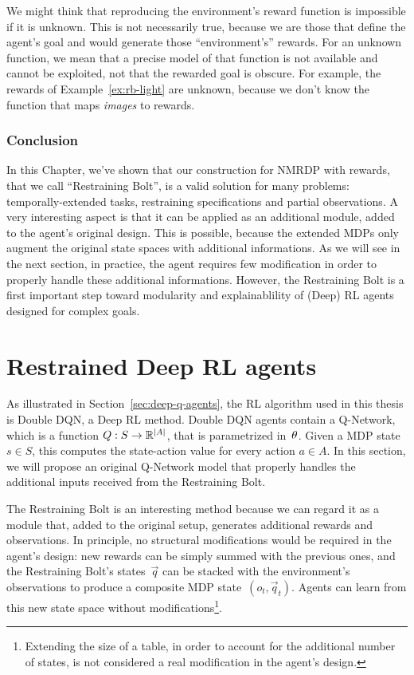 We might think that reproducing the environment's reward function is
impossible if it is unknown. This is not necessarily true, because we are
those that define the agent's goal and would generate those ``environment's''
rewards. For an unknown function, we mean that a precise model of that
function is not available and cannot be exploited, not that the rewarded goal
is obscure. For example, the rewards of Example~\ref{ex:rb-light} are unknown,
because we don't know the function that maps \emph{images} to rewards.


\subsubsection*{Conclusion}

In this Chapter, we've shown that our construction for NMRDP with \ldl{}
rewards, that we call ``Restraining Bolt'', is a valid solution for many
problems: temporally-extended tasks, restraining specifications and partial
observations. A very interesting aspect is that it can be applied as an
additional module, added to the agent's original design. This is possible,
because the extended MDPs only augment the original state spaces with
additional informations. As we will see in the next section, in practice, the
agent requires few modification in order to properly handle these additional
informations. However, the Restraining Bolt is a first important step toward
modularity and explainablility of (Deep) RL agents designed for complex
goals.



\section{Restrained Deep RL agents}

\label{sec:rb-deep-model}

As illustrated in Section~\ref{sec:deep-q-agents}, the RL algorithm used in
this thesis is Double DQN, a Deep RL method. Double DQN agents contain a
Q-Network, which is a function $Q: S \to \mathbb{R}^{\lvert A\rvert}$, that is parametrized
in~$\theta$. Given a MDP state~$s \in S$, this computes the state-action
value for every action $a \in A$. In this section, we will propose an original
Q-Network model that properly handles the additional inputs received from the
Restraining Bolt.

The Restraining Bolt is an interesting method because we can regard it as a
module that, added to the original setup, generates additional rewards and
observations. In principle, no structural modifications would be required in
the agent's design: new rewards can be simply summed with the previous ones,
and the Restraining Bolt's states~$\vec{q}$ can be stacked with the
environment's observations to produce a composite MDP state~$(o_t,
\vec{q}_t)$. Agents can learn from this new state space without
modifications\footnote{Extending the size of a table, in order to account for
the additional number of states, is not considered a real modification in the
agent's design.}.


